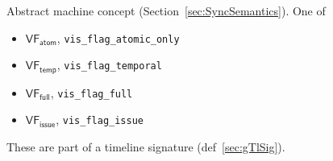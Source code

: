 
Abstract machine concept (Section~\ref{sec:SyncSemantics}).
One of
\begin{itemize}
  \item $\mathsf{VF_{atom}}$, \texttt{vis\_flag\_atomic\_only}
  \item $\mathsf{VF_{temp}}$, \texttt{vis\_flag\_temporal}
  \item $\mathsf{VF_{full}}$, \texttt{vis\_flag\_full}
  \item $\mathsf{VF_{issue}}$, \texttt{vis\_flag\_issue}
\end{itemize}
These are part of a timeline signature (def~\ref{sec:gTlSig}).

